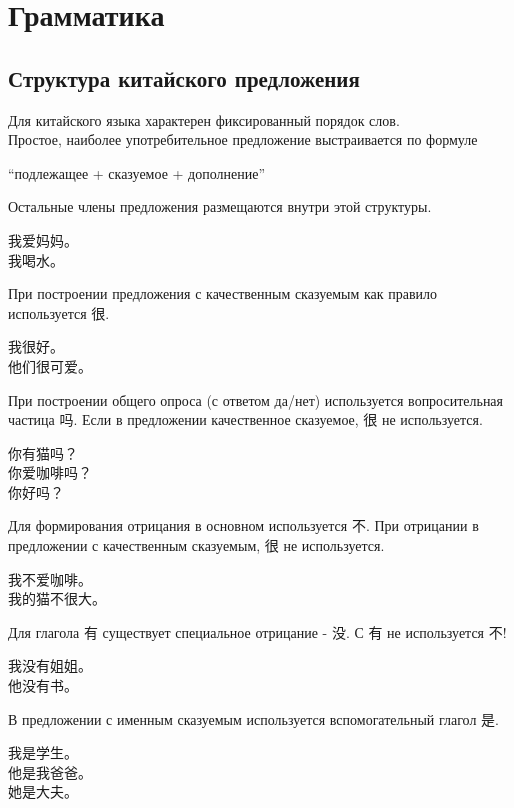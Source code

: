 \newpage
\section{Грамматика}
\subsection{Структура китайского предложения}
Для китайского языка характерен фиксированный порядок слов.\\
Простое, наиболее употребительное предложение выстраивается по формуле\\
\begin{center}
	“подлежащее + сказуемое + дополнение”
\end{center}
Остальные члены предложения размещаются внутри этой структуры.
\begin{example} \hfill \break \LARGE
	我爱妈妈。\\
	我喝水。\\
\end{example}
При построении предложения с качественным сказуемым как правило используется 很.
\begin{example}\hfill \break \LARGE
	我很好。\\
	他们很可爱。\\
\end{example}
При построении общего опроса (с ответом да/нет) используется вопросительная частица 吗. Если в предложении качественное сказуемое, 很 не используется.
\begin{example}\hfill \break \LARGE
	你有猫吗？\\
	你爱咖啡吗？\\
	你好吗？\\
\end{example}
Для формирования отрицания в основном используется 不. При отрицании в предложении с качественным сказуемым, 很 не используется.
\begin{example}\hfill \break \LARGE
	我不爱咖啡。\\
	我的猫不很大。\\
\end{example}
Для глагола 有 существует специальное отрицание - 没. С 有 не используется 不!
\begin{example}\hfill \break \LARGE
	我没有姐姐。\\
	他没有书。\\
\end{example}
В предложении с именным сказуемым используется вспомогательный глагол 是.
\begin{example}\hfill \break \LARGE
	我是学生。\\
	他是我爸爸。\\
	她是大夫。\\
\end{example}


